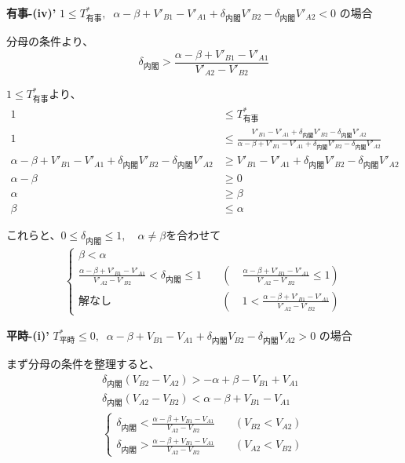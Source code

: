 \documentclass[main.tex]{subfiles}
\begin{document}
\bigskip
\textbf{有事-(iv)'}\; $1 \le T^*_{有事} ,\;\; \alpha-\beta + V'_{B1}-V'_{A1} + \delta_{内閣}V'_{B2} - \delta_{内閣}V'_{A2} < 0$ の場合


分母の条件より、
$$\delta_{内閣} > \frac{\alpha-\beta + V'_{B1}-V'_{A1}}{V'_{A2} - V'_{B2}} $$

$1 \le T^*_{有事}$より、
\begin{align*}
    1 &\le T^*_{有事}  \\
    1 &\le \frac{ V'_{B1} - V'_{A1} +\delta_{内閣}V'_{B2} - \delta_{内閣}V'_{A2} }{ \alpha-\beta + V'_{B1}-V'_{A1} + \delta_{内閣}V'_{B2} - \delta_{内閣}V'_{A2} }\\[1em]
    \alpha-\beta + V'_{B1}-V'_{A1} + \delta_{内閣}V'_{B2} - \delta_{内閣}V'_{A2}  &\ge V'_{B1} - V'_{A1} +\delta_{内閣}V'_{B2} - \delta_{内閣}V'_{A2} \\[1em]
    \alpha - \beta &\ge 0\\
    \alpha &\ge \beta\\
    \beta &\le \alpha
\end{align*}


これらと、$0 \le \delta_{内閣} \le 1, \quad \alpha ≠ \beta$を合わせて
\begin{align*}
\begin{cases}
    \beta < \alpha \\[1em]
    \frac{\alpha-\beta + V'_{B1}-V'_{A1}}{V'_{A2} - V'_{B2}} < \delta_{内閣} \le 1  \quad &(\quad \frac{\alpha-\beta + V'_{B1}-V'_{A1}}{V'_{A2} - V'_{B2}} \le 1 ) \\[1em]
    解なし   \quad &(\quad 1 < \frac{\alpha-\beta + V'_{B1}-V'_{A1}}{V'_{A2} - V'_{B2}} )
\end{cases}
\end{align*}




\newpage
\textbf{平時-(i)'}\; $T^*_{平時} \le 0,\;\; \alpha-\beta + V_{B1}-V_{A1} + \delta_{内閣}V_{B2} - \delta_{内閣}V_{A2} > 0$ の場合


まず分母の条件を整理すると、
\begin{align*}
    \delta_{内閣}(V_{B2} - V_{A2}) > -\alpha+\beta - V_{B1}+V_{A1} \\
    \delta_{内閣}(V_{A2} - V_{B2}) < \alpha-\beta + V_{B1}-V_{A1}\\
    \begin{cases}
        \delta_{内閣} < \frac{\alpha-\beta + V_{B1}-V_{A1}}{V_{A2} - V_{B2}} \quad &(V_{B2} < V_{A2})\\[1em]
        \delta_{内閣} > \frac{\alpha-\beta + V_{B1}-V_{A1}}{V_{A2} - V_{B2}} \quad &(V_{A2} < V_{B2})
    \end{cases}
\end{align*}
\end{document}
